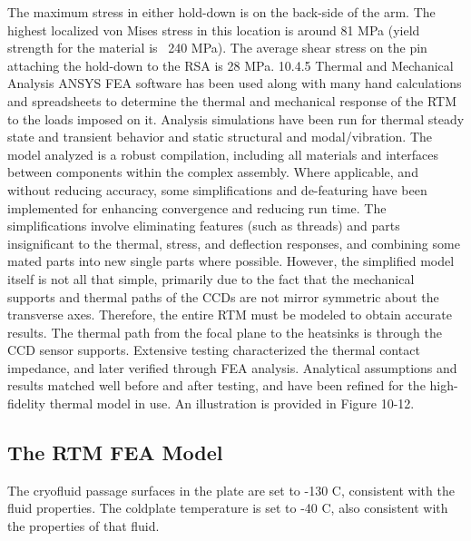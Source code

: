 The maximum stress in either hold-down is on the back-side of the arm. The highest localized von Mises stress in this location is around 81 MPa (yield strength for the material is ~240 MPa). The average shear stress on the pin attaching the hold-down to the RSA is 28 MPa.
10.4.5	Thermal and Mechanical Analysis
ANSYS FEA software has been used along with many hand calculations and spreadsheets to determine the thermal and mechanical response of the RTM to the loads imposed on it. Analysis simulations have been run for thermal steady state and transient behavior and static structural and modal/vibration. The model analyzed is a robust compilation, including all materials and interfaces between components within the complex assembly. Where applicable, and without reducing accuracy, some simplifications and de-featuring have been implemented for enhancing convergence and reducing run time. The simplifications involve eliminating features (such as threads) and parts insignificant to the thermal, stress, and deflection responses, and combining some mated parts into new single parts where possible. However, the simplified model itself is not all that simple, primarily due to the fact that the mechanical supports and thermal paths of the CCDs are not mirror symmetric about the transverse axes. Therefore, the entire RTM must be modeled to obtain accurate results. 
The thermal path from the focal plane to the heatsinks is through the CCD sensor supports. Extensive testing characterized the thermal contact impedance, and later verified through FEA analysis. Analytical assumptions and results matched well before and after testing, and have been refined for the high-fidelity thermal model in use. An illustration is provided in Figure 10-12. 

\subsection{The RTM FEA Model}
The cryofluid passage surfaces in the plate are set to -130 C, consistent with the fluid properties. The coldplate temperature is set to -40 C, also consistent with the properties of that fluid.
%
%
%

